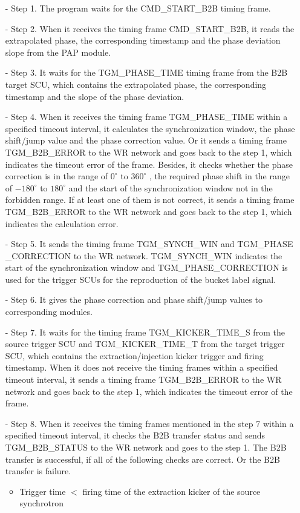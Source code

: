 \begin{itemize}
 	\begin{itemize}
		\item[-]Step 1. The program waits for the CMD\_START\_B2B timing frame.
 		\item[-]Step 2. When it receives the timing frame CMD\_START\_B2B, it reads the extrapolated phase, the corresponding timestamp and the phase deviation slope from the PAP module.
		\item[-]Step 3. It waits for the TGM\_PHASE\_TIME timing frame from the B2B target SCU, which contains the extrapolated phase, the corresponding timestamp and the slope of the phase deviation.
		\item[-]Step 4. When it receives the timing frame TGM\_PHASE\_TIME within a specified timeout interval, it calculates the synchronization window, the phase shift/jump value and the phase correction value. Or it sends a timing frame TGM\_B2B\_ERROR to the WR network and goes back to the step 1, which indicates the timeout error of the frame. Besides, it checks whether the phase correction is in the range of $0^\circ$ to $360^\circ$ , the required phase shift in the range of $-180^\circ$ to $180^\circ$ and the start of the synchronization window not in the forbidden range. If at least one of them is not correct, it sends a timing frame TGM\_B2B\_ERROR to the WR network and goes back to the step 1, which indicates the calculation error. 
		\item[-]Step 5. It sends the timing frame TGM\_SYNCH\_WIN and TGM\_PHASE \_CORRECTION to the WR network. TGM\_SYNCH\_WIN indicates the start of the synchronization window and TGM\_PHASE\_CORRECTION is used for the trigger SCUs for the reproduction of the bucket label signal.
		\item[-]Step 6. It gives the phase correction and phase shift/jump values to corresponding modules.
		\item[-]Step 7. It waits for the timing frame TGM\_KICKER\_TIME\_S from the source trigger SCU and TGM\_KICKER\_TIME\_T from the target trigger SCU, which contains the extraction/injection kicker trigger and firing timestamp. When it does not receive the timing frames within a specified timeout interval, it sends a timing frame TGM\_B2B\_ERROR to the WR network and goes back to the step 1, which indicates the timeout error of the frame.
		\item[-]Step 8. When it receives the timing frames mentioned in the step 7 within a specified timeout interval, it checks the B2B transfer status and sends TGM\_B2B\_STATUS to the WR network and goes to the step 1. The B2B transfer is successful, if all of the following checks are correct. Or the B2B transfer is failure. 
\begin{itemize}
	\item Trigger time $<$ firing time of the extraction kicker of the source synchrotron


\end{itemize}
\end{itemize}
\end{itemize}
